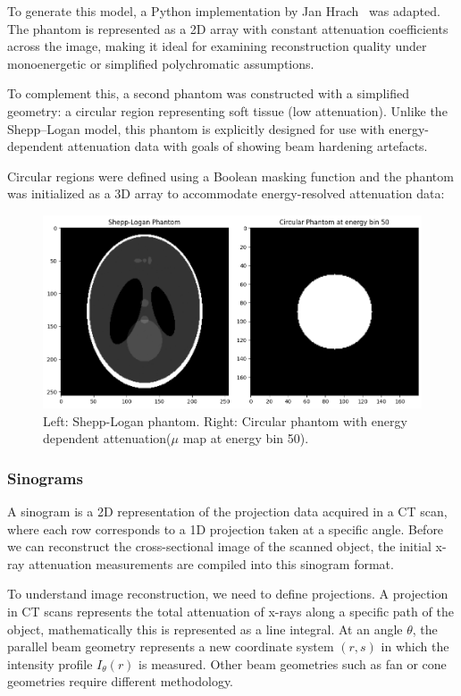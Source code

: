 \documentclass{article}
\theoremstyle{definition}
\begin{document}
To generate this model, a Python implementation by Jan Hrach~\cite{HrachovecPhantom} was adapted. The phantom is represented as a 2D array with constant attenuation coefficients across the image, making it ideal for examining reconstruction quality under monoenergetic or simplified polychromatic assumptions.

To complement this, a second phantom was constructed with a simplified geometry: a circular region representing soft tissue (low attenuation). Unlike the Shepp–Logan model, this phantom is explicitly designed for use with energy-dependent attenuation data with goals of showing beam hardening artefacts.

Circular regions were defined using a Boolean masking function and the phantom was initialized as a 3D array to accommodate energy-resolved attenuation data:

\begin{figure}[H]
	\includegraphics[width=\linewidth]{simplephantom.png}
	\caption{Left: Shepp-Logan phantom. Right: Circular phantom with energy dependent attenuation($\mu$ map at energy bin 50).}
	\label{fig:phantoms}
\end{figure}

\subsubsection{Sinograms}
\label{sinogramsec}
A sinogram is a 2D representation of the projection data acquired in a CT scan, where each row corresponds to a 1D projection taken at a specific angle. Before we can reconstruct the cross-sectional image of the scanned object, the initial x-ray attenuation measurements are compiled into this sinogram format.

To understand image reconstruction, we need to define projections. A projection in CT scans represents the total attenuation of x-rays along a specific path of the object, mathematically this is represented as a line integral. At an angle $\theta$, the parallel beam geometry represents a new coordinate system $(r, s)$ in which the intensity profile $I_\theta (r)$ is measured. Other beam geometries such as fan or cone geometries require different methodology.
\end{document}
